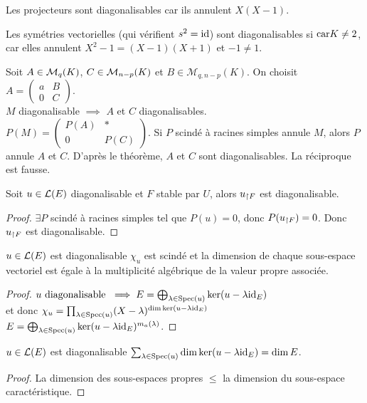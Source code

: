 \begin{example}
	Les projecteurs sont diagonalisables car ils annulent $X(X-1)$.

	Les symétries vectorielles (qui vérifient $s^2 = \text{id}$) sont diagonalisables
	si $\text{car} K \neq 2$, car elles annulent $X^2 - 1 = (X-1)(X+1)$ et $-1 \neq 1$.
\end{example}


\begin{example}
	Soit $A \in \mathcal{M}_{q}(K)$, $C \in \mathcal{M}_{n-p}(K)$ et $B \in \mathcal{M}_{q, n-p}(K)$.
	On choisit $A = \begin{pmatrix} a & B \\ 0 & C \end{pmatrix}$.\\
	$M$ diagonalisable $\implies$ $A$ et $C$ diagonalisables.\\
	$P(M) = \begin{pmatrix} P(A) & * \\ 0 & P(C) \end{pmatrix}$. Si $P$ scindé à racines simples annule $M$, alors $P$ annule $A$ et $C$.
	D'après le théorème, $A$ et $C$ sont diagonalisables.
	La réciproque est fausse.
\end{example}


\begin{prop}
	Soit $u \in \mathcal{L}(E)$ diagonalisable et $F$ stable par $U$, alors $u_{\restriction F} $ est diagonalisable.
\end{prop}

\begin{proof}
	$\exists P$ scindé à racines simples tel que $P(u) = 0$, donc $P(u_{\restriction F}) = 0$. Donc $u_{\restriction F}$ est diagonalisable.
\end{proof}


\begin{theorem}
	$u \in \mathcal{L}(E)$ est diagonalisable \ssi $\chi_u$ est scindé et la dimension de chaque sous-espace vectoriel est égale à la multiplicité
	algébrique de la valeur propre associée.
\end{theorem}

\begin{proof}
	$u \text{ diagonalisable } \implies E = \bigoplus_{\lambda \in \text{Spec}(u)} \ker(u - \lambda \text{id}_E)$\\
	et donc $\chi_u = \prod_{\lambda \in \text{Spec}(u)} (X - \lambda)^{\dim \ker(u - \lambda \text{id}_E)}$\\
	$E = \bigoplus_{\lambda \in \text{Spec}(u)} \ker(u - \lambda \text{id}_E)^{m_a(\lambda)}$.

\end{proof}


\begin{coro}
	$u \in \mathcal{L}(E)$ est diagonalisable \ssi $\sum_{\lambda \in \text{Spec}(u)} \dim \ker(u - \lambda \text{id}_E) = \dim E$.
\end{coro}

\begin{proof}
	La dimension des sous-espaces propres $\leq$ la dimension du sous-espace caractéristique. %
\end{proof}
